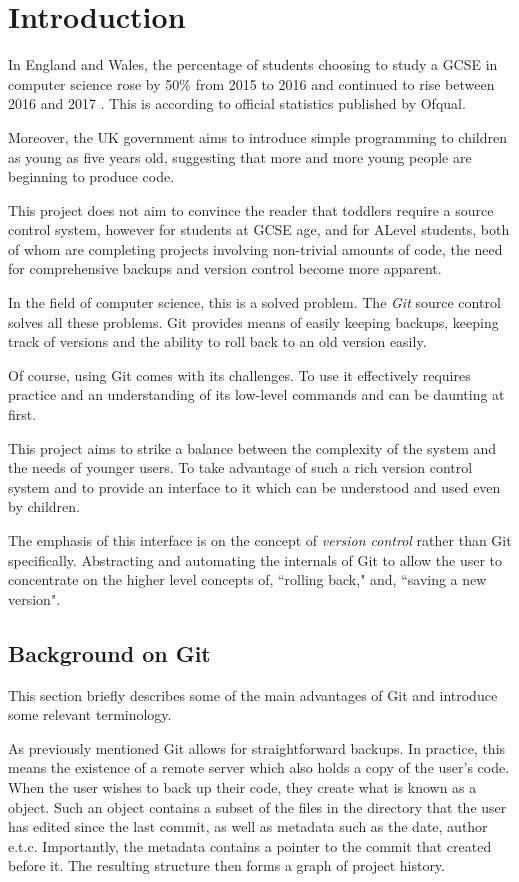 \chapter{Introduction}

In England and Wales, the percentage of students choosing to study a GCSE in computer science rose by 50\% from 2015 to 2016 and continued to rise between 2016 and 2017 \cite{ofqual}. This is according to official statistics published by Ofqual.

Moreover, the UK government aims to introduce simple programming to children as young as five years old, suggesting that more and more young people are beginning to produce code.

This project does not aim to convince the reader that toddlers require a source control system, however for students at GCSE age, and for ALevel students, both of whom are completing projects involving non-trivial amounts of code, the need for comprehensive backups and version control become more apparent.

In the field of computer science, this is a solved problem. The \emph{Git} source control solves all these problems. Git provides means of easily keeping backups, keeping track of versions and the ability to roll back to an old version easily.

Of course, using Git comes with its challenges. To use it effectively requires practice and an understanding of its low-level commands and can be daunting at first.

This project aims to strike a balance between the complexity of the system and the needs of younger users. To take advantage of such a rich version control system and to provide an interface to it which can be understood and used even by children.

The emphasis of this interface is on the concept of \emph{version control} rather than Git specifically. Abstracting and automating the internals of Git to allow the user to concentrate on the higher level concepts of, ``rolling back," and, ``saving a new version".

\section{Background on Git}

This section briefly describes some of the main advantages of Git and introduce some relevant terminology. 

As previously mentioned Git allows for straightforward backups. In practice, this means the existence of a remote server which also holds a copy of the user's code. When the user wishes to back up their code, they create what is known as a \commit object. Such an object contains a subset of the files in the directory that the user has edited since the last commit, as well as metadata such as the date, author e.t.c. Importantly, the metadata contains a pointer to the commit that created before it. The resulting structure then forms a graph of project history.

